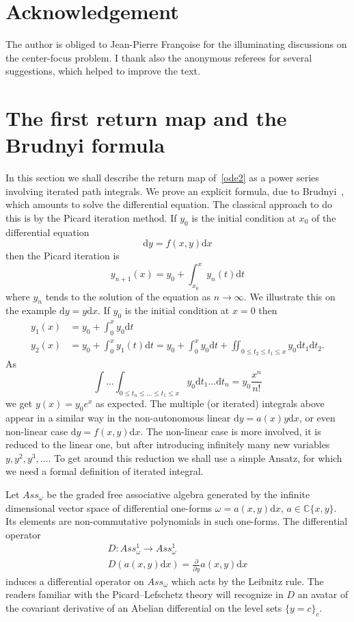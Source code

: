 \documentclass[11pt]{article}
\theoremstyle{definition}
\numberwithin{equation}{section}
\numberwithin{figure}{section}
\numberwithin{table}{section}
\newcommand*{\dd}{\mathrm{d}}
\newcommand*{\dx}{\dd x}
\newcommand*{\dy}{\dd y}
\newcommand*{\dt}{\dd t}
\newcommand{\Cbb}{\mathbb C}
\begin{document}
\section*{Acknowledgement}
The author is obliged to Jean-Pierre Françoise for the illuminating discussions on the center-focus problem. I thank also the anonymous referees for several suggestions, which helped to improve the text.

\section{The first return map and the Brudnyi formula}\label{section2}
In this section we shall describe the return map of~\eqref{ode2} as a power series involving iterated path integrals. We prove an explicit formula, due to Brudnyi~\cite{brud06}, which amounts to solve the differential equation. The classical approach to do this is by the Picard iteration method. If $y_0$ is the initial condition at $x_0$ of the differential equation
\[
\dy = f(x,y) \dx
\]
then the Picard iteration is
\[
y_{n+1}(x) = y_0 + \int_{x_0}^x y_n(t) \dt
\]
where $y_n$ tends to the solution of the equation as $n\to \infty$. We illustrate this on the example $\dy = y \dx$. If $y_0$ is the initial condition at $x = 0$ then
\begin{align*}\label{exp}
y_1(x) & = y_0 + \int_0^x y_0 \dt\\
y_2(x) & = y_0 + \int_0^x y_1(t) \dt = y_0 + \int_0^x y_0 \dt + \iint_{0\leq t_2\leq t_1\leq x} y_0 \dt_1 \dt_2.
\end{align*}
As
\[
\int \dots \int_{0 \leq t_n\leq \dots \leq t_1\leq x}y_0 \dt_1 \dots \dt_n = y_0 \frac{x^n}{n!}
\]
we get $y(x) = y_0 e^x$ as expected. The multiple (or iterated) integrals above appear in a similar way in the non-autonomous linear $\dy=a(x) y \dx$, or even non-linear case $\dy=f(x,y) \dx$. The non-linear case is more involved, it is reduced to the linear one, but after introducing infinitely many new variables $y, y^2, y^3, \dots $. To get around this reduction we shall use a simple Ansatz, for which we need a formal definition of iterated integral.



Let $Ass_\omega$ be the graded free associative algebra generated by the infinite dimensional vector space of differential one-forms $\omega = a(x,y) \dx$, $a \in \Cbb\{x,y\}$. Its elements are non-commutative polynomials in such one-forms. The differential operator
\begin{gather*}
D : Ass^1_\omega \to Ass^1_\omega
\\
D(a(x,y) \dx) = \frac{\partial}{\partial y} a(x,y) \dx
\end{gather*}
induces a differential operator on $ Ass_\omega$ which acts by the Leibnitz rule. The readers familiar with the Picard--Lefschetz theory will recognize in $D$ an avatar of the covariant derivative of an Abelian differential on the level sets $\{y=c \}_c$.
\end{document}
